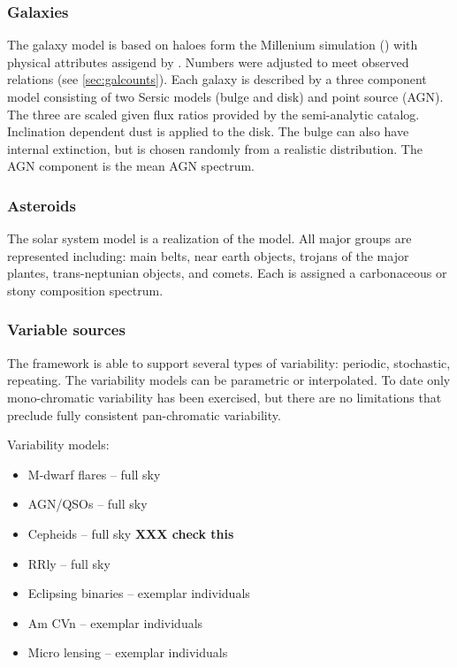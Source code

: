 \documentclass[]{article}
\begin{document}
\subsubsection{Galaxies}
The galaxy model is based on haloes form the Millenium simulation (\cite{millenium}) with physical attributes assigend by \cite{dilucia}.  
Numbers were adjusted to meet observed relations (see \ref{sec:galcounts}).  Each galaxy is described by a three component model consisting 
of two Sersic models (bulge and disk) and point source (AGN).  The three are scaled given flux ratios provided by the semi-analytic catalog.  Inclination dependent
dust is applied to the disk.  The bulge can also have internal extinction, but is chosen randomly from a realistic distribution.  The
AGN component is the \cite{vandenberk} mean AGN spectrum.

\subsubsection{Asteroids}
The solar system model is a realization of the \cite{grav} model.  All major groups are represented including: main belts, near earth objects, 
trojans of the major plantes, trans-neptunian objects, and comets.  Each is assigned a carbonaceous or stony composition spectrum.

\subsubsection{Variable sources}
The framework is able to support several types of variability: periodic, stochastic, repeating.  The variability models can be parametric or interpolated.  
To date only mono-chromatic variability has been exercised, but there are no limitations that preclude fully consistent pan-chromatic variability.

Variability models:
\begin{itemize}
\item M-dwarf flares -- full sky
\item AGN/QSOs -- full sky
\item Cepheids -- full sky {\bf XXX check this}
\item RRly -- full sky
\item Eclipsing binaries -- exemplar individuals
\item Am CVn -- exemplar individuals
\item Micro lensing -- exemplar individuals
\end{itemize}
\end{document}
